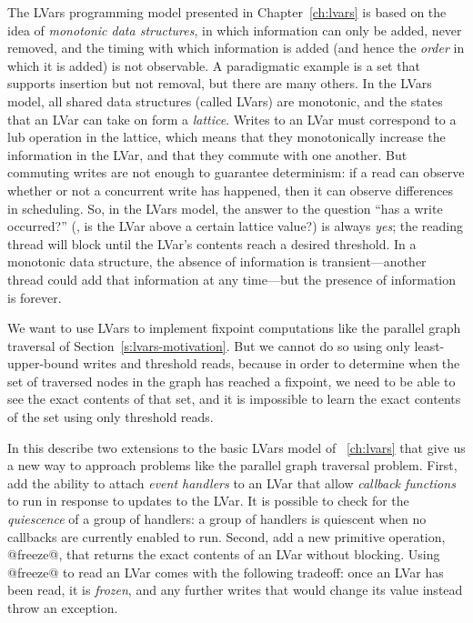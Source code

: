 \ifdefined\DISSERTATION
The LVars programming model presented in Chapter~\ref{ch:lvars} is
based on the idea of \emph{monotonic data structures}, in which
information can only be added, never removed, and the timing with
which information is added (and hence the \emph{order} in which it is
added) is not observable.  A paradigmatic example is a set that
supports insertion but not removal, but there are many others.  In the
LVars model, all shared data structures (called LVars) are monotonic,
and the states that an LVar can take on form a \emph{lattice}.  Writes
to an LVar must correspond to a lub operation in the lattice, which
means that they monotonically increase the information in the LVar,
and that they commute with one another.  But commuting writes are not
enough to guarantee determinism: if a read can observe whether or not
a concurrent write has happened, then it can observe differences in
scheduling.  So, in the LVars model, the answer to the question ``has
a write occurred?''  (\ie, is the LVar above a certain lattice value?)
is always
\emph{yes}; the reading thread will block until the LVar's contents
reach a desired threshold.  In a monotonic data structure, the absence
of information is transient---another thread could add that
information at any time---but the presence of information is forever.
\fi

We want to use LVars to implement fixpoint computations like the
parallel graph traversal of Section~\ref{s:lvars-motivation}.  But we
cannot do so using only least-upper-bound writes and threshold reads,
because in order to determine when the set of traversed nodes in the
graph has reached a fixpoint, we need to be able to see the exact
contents of that set, and it is impossible to learn the exact contents
of the set using only threshold reads.

In this  describe two extensions to the basic LVars model
of ~\ref{ch:lvars} that give us a new way to approach problems like
the parallel graph traversal problem.
First,  add the ability to attach \emph{event handlers} to an LVar
that allow \emph{callback functions} to run in response to updates to
the LVar.  It is possible to check for the \emph{quiescence} of a
group of handlers: a group of handlers is quiescent when no callbacks
are currently enabled to run.  Second,  add a new primitive
operation, @freeze@, that returns the exact contents of an LVar
without blocking.  Using @freeze@ to read an LVar comes with the
following tradeoff: once an LVar has been read, it is \emph{frozen},
and any further writes that would change its value instead throw an
exception.

